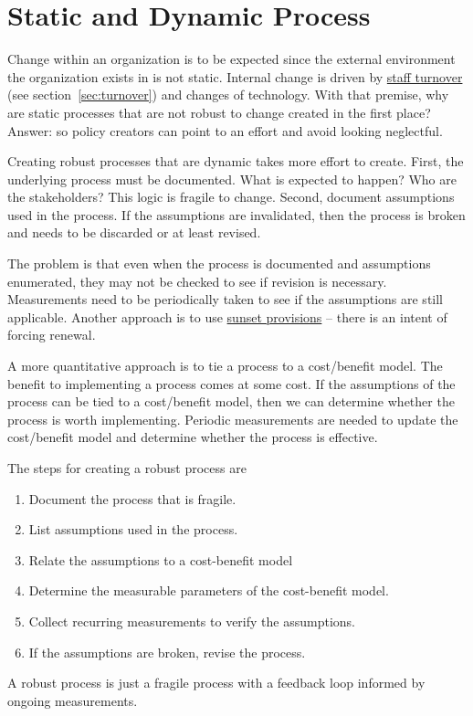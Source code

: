 \section{Static and Dynamic Process\label{sec:static-dynamic-processes}}


Change within an organization is to be expected since the external environment the organization exists in is not static. Internal change is driven by \hyperref[sec:turnover]{staff turnover} 
\ifsectionref
(see section~\ref{sec:turnover}) 
\fi
and changes of technology. With that premise, why are static processes that are not robust to change created in the first place? Answer: so policy creators can point to an effort and avoid looking neglectful.

Creating robust processes that are dynamic takes more effort to create. First, the underlying process must be documented. What is expected to happen? Who are the stakeholders? This logic is fragile to change. Second, document assumptions used in the process. If the assumptions are invalidated, then the process is broken and needs to be discarded or at least revised. 

The problem is that even when the process is documented and assumptions enumerated, they may not be checked to see if revision is necessary. Measurements need to be periodically taken to see if the assumptions are still applicable. Another approach is to use \href{https://en.wikipedia.org/wiki/Sunset_provision}{sunset provisions} -- there is an intent of forcing renewal. 

A more quantitative approach is to tie a process to a cost/benefit model. The benefit to implementing a process comes at some cost. If the assumptions of the process can be tied to a cost/benefit model, then we can determine whether the process is worth implementing. Periodic measurements are needed to update the cost/benefit model and determine whether the process is effective.

The steps for creating a robust process are
\begin{enumerate}
    \item Document the process that is fragile.
    \item List assumptions used in the process. 
    \item Relate the assumptions to a cost-benefit model
    \item Determine the measurable parameters of the cost-benefit model. 
    \item Collect recurring measurements to verify the assumptions. 
    \item If the assumptions are broken, revise the process. 
\end{enumerate}
A robust process is just a fragile process with a feedback loop informed by ongoing measurements. 